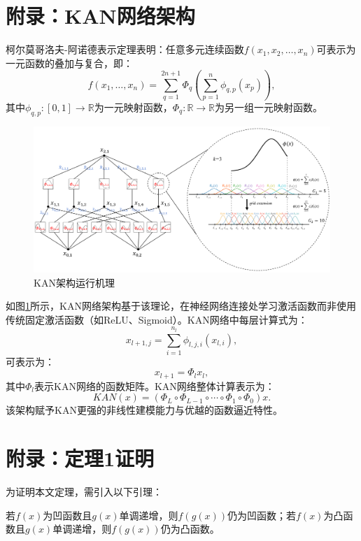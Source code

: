 \documentclass[lang=cn,12pt,a4paper]{elegantpaper}
\begin{document}
\section{附录：KAN网络架构}
\label{sec:appendix_kan}

柯尔莫哥洛夫-阿诺德表示定理表明：任意多元连续函数$f(x_1, x_2, \ldots, x_n)$可表示为一元函数的叠加与复合\citep{Braun2009}，即：
\begin{equation}
f(x_1, \ldots, x_n) = \sum_{q=1}^{2n+1} \Phi_q \left( \sum_{p=1}^n \phi_{q,p}(x_p) \right),
\end{equation}
其中$\phi_{q,p} : [0,1] \rightarrow \mathbb{R}$为一元映射函数，$\Phi_q : \mathbb{R} \rightarrow \mathbb{R}$为另一组一元映射函数。

\begin{figure}[H]
        \centering
        \includegraphics[width=1\textwidth]{图片14.png}
        \caption{KAN架构运行机理}
        \label{fig:fig14}
\end{figure}
如图\ref{fig:fig14}所示，KAN网络架构基于该理论，在神经网络连接处学习激活函数而非使用传统固定激活函数（如ReLU、Sigmoid）。KAN网络中每层计算式为：
\begin{equation}
x_{l+1,j} = \sum_{i=1}^{n_l} \phi_{l,j,i}(x_{l,i}),
\end{equation}
可表示为：
\begin{equation}
x_{l+1} = \Phi_l x_l,
\end{equation}
其中$\Phi_l$表示KAN网络的函数矩阵。KAN网络整体计算表示为：
\begin{equation}
KAN(x) = (\Phi_L \circ \Phi_{L-1} \circ \cdots \circ \Phi_1 \circ \Phi_0) x.
\end{equation}
该架构赋予KAN更强的非线性建模能力与优越的函数逼近特性。

\section{附录：定理1证明}
\label{sec:appendix_proof}
为证明本文定理，需引入以下引理：
\label{sec:proof}
\begin{lemma}[复合函数凹凸性传递规则]
        若$f(x)$为凹函数且$g(x)$单调递增，则$f(g(x))$仍为凹函数；若$f(x)$为凸函数且$g(x)$单调递增，则$f(g(x))$仍为凸函数。
    \end{lemma}
    
\end{document}
